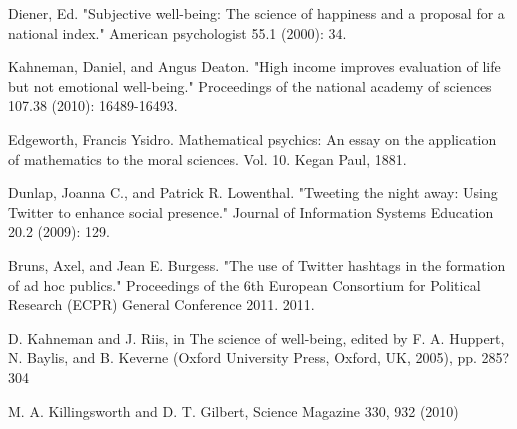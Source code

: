\documentclass[journal, a4paper]{IEEEtran}
\begin{document}
\begin{thebibliography}{5}
   Diener, Ed. "Subjective well-being: The science of happiness and a proposal for a national index." American psychologist 55.1 (2000): 34.
   
   Kahneman, Daniel, and Angus Deaton. "High income improves evaluation of life but not emotional well-being." Proceedings of the national academy of sciences 107.38 (2010): 16489-16493.
   
   Edgeworth, Francis Ysidro. Mathematical psychics: An essay on the application of mathematics to the moral sciences. Vol. 10. Kegan Paul, 1881.
   
   Dunlap, Joanna C., and Patrick R. Lowenthal. "Tweeting the night away: Using Twitter to enhance social presence." Journal of Information Systems Education 20.2 (2009): 129.
   
   Bruns, Axel, and Jean E. Burgess. "The use of Twitter hashtags in the formation of ad hoc publics." Proceedings of the 6th European Consortium for Political Research (ECPR) General Conference 2011. 2011.
   
   D. Kahneman and J. Riis, in The science of well-being,
edited by F. A. Huppert, N. Baylis, and B. Keverne
(Oxford University Press, Oxford, UK, 2005), pp. 285?
304
   
   M. A. Killingsworth and D. T. Gilbert, Science Magazine
330, 932 (2010)

\end{thebibliography}

\end{document}
